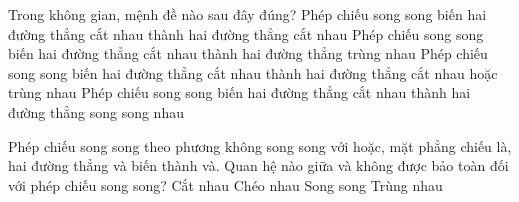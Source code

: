 \begin{ex}%
Trong không gian, mệnh đề nào sau đây đúng?
\choice
{Phép chiếu song song biến hai đường thẳng cắt nhau thành hai đường thẳng cắt nhau}
{Phép chiếu song song biến hai đường thẳng cắt nhau thành hai đường thẳng trùng nhau}
{\True Phép chiếu song song biến hai đường thẳng cắt nhau thành hai đường thẳng cắt nhau hoặc trùng nhau}
{Phép chiếu song song biến hai đường thẳng cắt nhau thành hai đường thẳng song song nhau}
\end{ex}

\begin{ex}%
Phép chiếu song song theo phương không song song với hoặc, mặt phẳng chiếu là, hai đường thẳng và biến thành và. Quan hệ nào giữa và không được bảo toàn đối với phép chiếu song song?
\choice
{Cắt nhau}
{\True Chéo nhau}
{Song song}
{Trùng nhau}
\end{ex}

